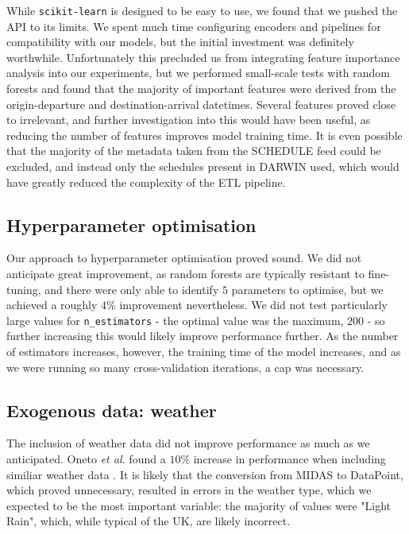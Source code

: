 \documentclass[12pt,a4paper]{article}
\begin{document}
While \verb|scikit-learn| is designed to be easy to use, we found that we pushed the API to its limits. We spent much time configuring encoders and pipelines for compatibility with our models, but the initial investment was definitely worthwhile. Unfortunately this precluded us from integrating feature importance analysis into our experiments, but we performed small-scale tests with random forests and found that the majority of important features were derived from the origin-departure and destination-arrival datetimes. Several features proved close to irrelevant, and further investigation into this would have been useful, as reducing the number of features improves model training time. It is even possible that the majority of the metadata taken from the SCHEDULE feed could be excluded, and instead only the schedules present in DARWIN used, which would have greatly reduced the complexity of the ETL pipeline.

\subsection{Hyperparameter optimisation}

Our approach to hyperparameter optimisation proved sound. We did not anticipate great improvement, as random forests are typically resistant to fine-tuning, and there were only able to identify $5$ parameters to optimise, but we achieved a roughly $4\%$ improvement nevertheless. We did not test particularly large values for \verb|n_estimators| - the optimal value was the maximum, $200$ - so further increasing this would likely improve performance further. As the number of estimators increases, however, the training time of the model increases, and as we were running so many cross-validation iterations, a cap was necessary. 

\subsection{Exogenous data: weather}

The inclusion of weather data did not improve performance as much as we anticipated. Oneto \textit{et al.} found a $10\%$ increase in performance when including similiar weather data \cite{oneto_et_al_2016}. It is likely that the conversion from MIDAS to DataPoint, which proved unnecessary, resulted in errors in the weather type, which we expected to be the most important variable: the majority of values were "Light Rain", which, while typical of the UK, are likely incorrect.
\end{document}
